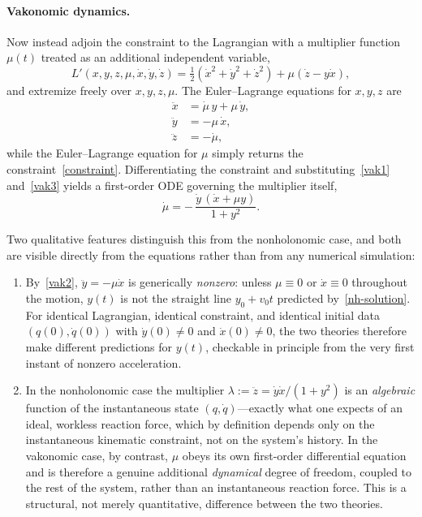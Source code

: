 \paragraph{Vakonomic dynamics.}
Now instead adjoin the constraint to the Lagrangian with a multiplier function
$\mu(t)$ treated as an additional independent variable,
\begin{equation}
L'(x,y,z,\mu,\dot x,\dot y,\dot z) = \tfrac12(\dot x^2+
    \dot y^2+\dot z^2) + \mu(\dot z - y\dot x),
\end{equation}
and extremize freely over $x,y,z,\mu$. The Euler--Lagrange equations for
$x,y,z$ are
\begin{align}
\ddot x &= \dot\mu\, y + \mu\,\dot y, \label{vak1}\\
\ddot y &= -\mu\,\dot x, \label{vak2}\\
\ddot z &= -\dot\mu, \label{vak3}
\end{align}
while the Euler--Lagrange equation for $\mu$ simply returns the
constraint~\eqref{constraint}. Differentiating the constraint and
substituting~\eqref{vak1} and~\eqref{vak3} yields a first-order ODE governing
the multiplier itself,
\begin{equation}
\dot\mu = -\,\frac{\dot y\,(\dot x + \mu y)}{1+y^2} .
\end{equation}

Two qualitative features distinguish this from the nonholonomic case, and both
are visible directly from the equations rather than from any numerical
simulation:

\begin{enumerate}
\item By~\eqref{vak2}, $\ddot y = -\mu\dot x$ is generically \emph{nonzero}:
    unless $\mu\equiv 0$ or $\dot x \equiv 0$ throughout the motion, $y(t)$ is
        not the straight line $y_0+v_0t$ predicted by~\eqref{nh-solution}. For
        identical Lagrangian, identical constraint, and identical initial data
        $(q(0),\dot q(0))$ with $\dot y(0)\neq 0$ and $\dot x(0)\ne0$, the two
        theories therefore make different predictions for $y(t)$, checkable in
        principle from the very first instant of nonzero acceleration.
\item In the nonholonomic case the multiplier $\lambda := \ddot z = \dot y \dot
    x/(1+y^2)$ is an \emph{algebraic} function of the instantaneous state
        $(q,\dot q)$---exactly what one expects of an ideal, workless reaction
        force, which by definition depends only on the instantaneous kinematic
        constraint, not on the system's history. In the vakonomic case, by
        contrast, $\mu$ obeys its own first-order differential equation and is
        therefore a genuine additional \emph{dynamical} degree of freedom,
        coupled to the rest of the system, rather than an instantaneous
        reaction force. This is a structural, not merely quantitative,
        difference between the two theories.
\end{enumerate}

